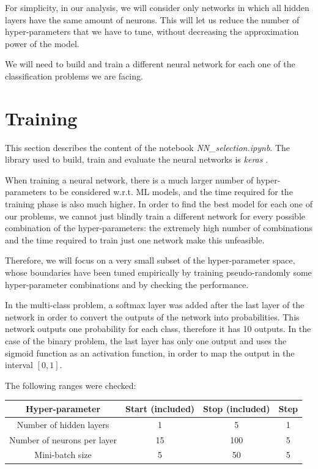 \documentclass{Configuration_Files/PoliMi3i_thesis}
\begin{document}
For simplicity, in our analysis, we will consider only networks in which all hidden layers have the same amount of neurons. This will let us reduce the number of hyper-parameters that we have to tune, without decreasing the approximation power of the model.

We will need to build and train a different neural network for each one of the classification problems we are facing.


\section{Training}
\label{sec:training}%
This section describes the content of the notebook \textit{NN\_selection.ipynb}. The library used to build, train and evaluate the neural networks is \textit{keras} \cite{chollet2015keras}.

When training a neural network, there is a much larger number of hyper-parameters to be considered w.r.t. ML models, and the time required for the training phase is also much higher. 
In order to find the best model for each one of our problems, we cannot just blindly train a different network for every possible combination of the hyper-parameters: the extremely high number of combinations and the time required to train just one network make this unfeasible. 

Therefore, we will focus on a very small subset of the hyper-parameter space, whose boundaries have been tuned empirically by training pseudo-randomly some hyper-parameter combinations and by checking the performance.

In the multi-class problem, a softmax layer was added after the last layer of the network in order to convert the outputs of the network into probabilities. This network outputs one probability for each class, therefore it has 10 outputs. In the case of the binary problem, the last layer has only one output and uses the sigmoid function as an activation function, in order to map the output in the interval $[0,1]$.

The following ranges were checked:
\begin{table}[H]
    \centering 
    \begin{tabular}{|c | c c  c |}
    \hline
    \rowcolor{bluepoli!40} 
     Hyper-parameter & Start (included) & Stop (included) & Step \T\B \\
    \hline \hline
    Number of hidden layers & 1 & 5 & 1  \T\B \\
    Number of neurons per layer & 15 & 100 & 5   \T\B \\
    Mini-batch size & 5 & 50 & 5   \T\B \\
    \hline
    \end{tabular}
    \\[10pt]
    \end{table}
    
\end{document}
